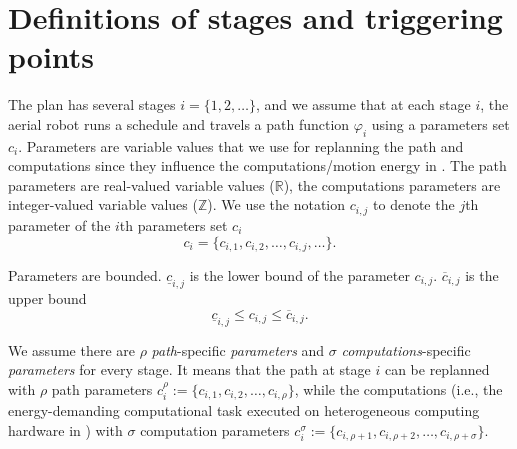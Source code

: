 \section{Definitions of stages and triggering points}
\label{sec:defs-stages-triggs}



The plan has several stages $i=\{1,2,\dots\}$, and we assume that at each stage $i$, the aerial robot runs a schedule and travels a path function $\varphi_i$ using a parameters set $c_i$.
Parameters are variable values that we use for replanning the path and computations since they influence the computations/motion energy in . The path parameters are real-valued variable values ($\mathbb{R}$), the computations parameters are integer-valued variable values ($\mathbb{Z}$). We use the notation  $c_{i,j}$ to denote the $j$th parameter of the $i$th parameters set $c_i$
\begin{equation}
  c_i=\{c_{i,1},c_{i,2},\dots,c_{i,j},\dots\}.
\end{equation}

Parameters are bounded. $\underline{c}_{i,j}$ is the lower bound of the parameter $c_{i,j}$. $\overline{c}_{i,j}$ is the upper bound
\begin{equation}
  \underline{c}_{i,j}\leq c_{i,j}\leq\overline{c}_{i,j}.
\end{equation}

We assume there are $\rho$ \emph{path}-specific \emph{parameters} and $\sigma$ \emph{computations}-specific \emph{parameters} for every stage. It means that the path at stage $i$ can be replanned with $\rho$ path parameters
$c_i^\rho:=\{c_{i,1},c_{i,2},\dots,c_{i,\rho}\}$,
while the computations (i.e., the energy-demanding computational task executed on heterogeneous computing hardware in ) with $\sigma$ computation parameters 
$c_i^\sigma:=\{c_{i,\rho+1},c_{i,\rho+2},\dots,c_{i,\rho+\sigma}\}$.

